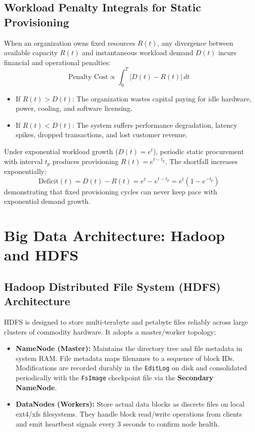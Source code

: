 \subsection{Workload Penalty Integrals for Static Provisioning}
When an organization owns fixed resources $R(t)$, any divergence between available capacity $R(t)$ and instantaneous workload demand $D(t)$ incurs financial and operational penalties:
\begin{equation}
\text{Penalty Cost} \propto \int_{0}^{T} |D(t) - R(t)|\, dt
\end{equation}
\begin{itemize}[leftmargin=*]
  \item If $R(t) > D(t)$: The organization wastes capital paying for idle hardware, power, cooling, and software licensing.
  \item If $R(t) < D(t)$: The system suffers performance degradation, latency spikes, dropped transactions, and lost customer revenue.
\end{itemize}

Under exponential workload growth ($D(t) = e^t$), periodic static procurement with interval $t_p$ produces provisioning $R(t) = e^{t - t_p}$. The shortfall increases exponentially:
\begin{equation}
\text{Deficit}(t) = D(t) - R(t) = e^t - e^{t - t_p} = e^t (1 - e^{-t_p})
\end{equation}
demonstrating that fixed provisioning cycles can never keep pace with exponential demand growth.

\section{Big Data Architecture: Hadoop and HDFS}
\subsection{Hadoop Distributed File System (HDFS) Architecture}
HDFS is designed to store multi-terabyte and petabyte files reliably across large clusters of commodity hardware. It adopts a master/worker topology:
\begin{itemize}[leftmargin=*]
  \item \textbf{NameNode (Master):} Maintains the directory tree and file metadata in system RAM. File metadata maps filenames to a sequence of block IDs. Modifications are recorded durably in the \texttt{EditLog} on disk and consolidated periodically with the \texttt{FsImage} checkpoint file via the \textbf{Secondary NameNode}.
  \item \textbf{DataNodes (Workers):} Store actual data blocks as discrete files on local ext4/xfs filesystems. They handle block read/write operations from clients and emit heartbeat signals every 3 seconds to confirm node health.
\end{itemize}

